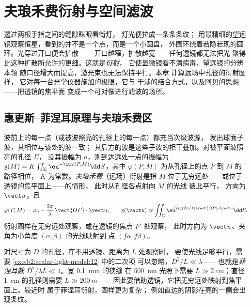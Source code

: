 \chapter{夫琅禾费衍射与空间滤波}\label{ch:b2:diffraction}

透过两根手指之间的缝隙眯眼看街灯，
灯光便拉成一条条条纹；
用最精细的望远镜观察恒星，看到的并不是一个点，而是一个小圆盘，
外围环绕着若隐若现的圆环。光穿过开口便会扩散——
开口越窄，扩散越宽——任何透镜都无法把光
聚得比这种扩散所允许的更细。这就是\emph{衍射}，
它使显微镜看不清病毒，望远镜的分辨本领
随口径增大而提高，激光束也无法保持平行。本章
计算远场中孔径的衍射图样，
它对每一台光学仪器施加的极限，它与
干涉的结合方式，以及阿贝的思想——把透镜的焦平面
变成一个可对像进行滤波的场所。

\section{惠更斯–菲涅耳原理与夫琅禾费区}

\begin{definition}\label{def:b2:diffraction:huygens}
波前上的每一点（或被波照亮的孔径上的每一点）都充当次级波源，
发出球面子波，其相位与该处的波一致；
其后方的波是这些子波的相干叠加。对被平面波照亮的孔径 $\Sigma$，
设其振幅为 $a$，则到达远处一点的振幅为
$\underline s(M) = K\iint_\Sigma\eu^{-\iu\varphi(P, M)}\dd S$，其中
$\varphi(P, M)$ 为从孔径上的点 $P$ 到 $M$ 的路径相位，
$K$ 为常数。\emph{夫琅禾费}（远场）衍射是指 $M$ 位于无穷远处——或位于透镜的焦平面上——的情形，
此时从孔径各点射向 $M$ 的光线
彼此平行，
方向为 $\vect u$，且
\[
\varphi(P, M) = \varphi_0 - \frac{2\pi}\lambda\,\vect{OP}\cdot\vect u , \qquad
\underline s(\vect u) \propto \iint_\Sigma\eu^{\iu(2\pi/\lambda)\vect{OP}\cdot\vect u}\dd S .
\]
衍射图样在无穷远处观察，或在透镜的焦点 $F'$ 处观察，
此时方向为 $\vect u$、夹角为小角度 $(\alpha, \beta)$ 的光线映射到
点 $(f\alpha, f\beta)$。
\end{definition}
\admitted

\begin{remark}[距离多远才算足够远？]\label{rem:b2:diffraction:fresnelnumber}
对尺寸为 $D$ 的孔径，在不用透镜、距离为 $L$ 处观察时，
要使光线足够平行，需要 \cref{exo:b2:scalar-light-model:12} 中的二次项
可以忽略，$D^2/L \ll \lambda$——
也就是\emph{菲涅耳数} $D^2/\lambda L \ll 1$。宽 \qty{0.1}{mm} 的狭缝
在 \qty{500}{nm} 光照下需要 $L \gg \qty{2}{cm}$；直径 \qty{1}{cm} 的孔径则需要 $L \gg \qty{200}{m}$——
因此要借助透镜，它把无穷远处映射到焦平面上。较近时
属于菲涅耳衍射，图样更为复杂；
例如直边的阴影在亮的一侧会出现条纹。
\end{remark}


